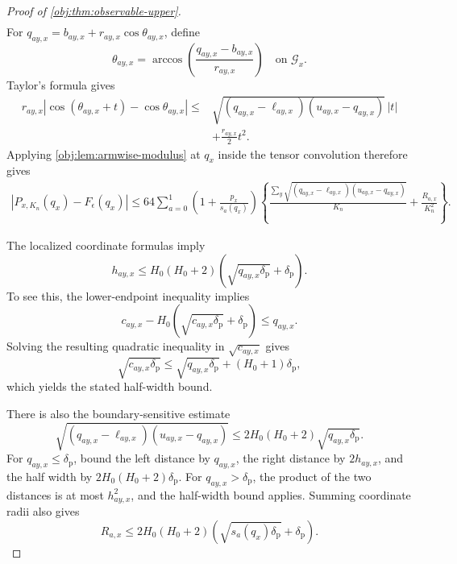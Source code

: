 \documentclass[11pt]{article}
\begin{document}
\begin{proof}[Proof of \cref{obj:thm:observable-upper}]
\[\begin{aligned}
\end{aligned}
\]
For \(q_{ay,x}=b_{ay,x}+r_{ay,x}\cos\theta_{ay,x}\), define
\[
\theta_{ay,x}
=
\arccos\left(\frac{q_{ay,x}-b_{ay,x}}{r_{ay,x}}\right)
\quad\text{on }\mathcal G_x.
\]
Taylor's formula gives
\[
\begin{aligned}
r_{ay,x}
|\cos(\theta_{ay,x}+t)-\cos\theta_{ay,x}|
\le{}&
\sqrt{(q_{ay,x}-\ell_{ay,x})(u_{ay,x}-q_{ay,x})}\,|t|\\
&+\frac{r_{ay,x}}2t^2.
\end{aligned}
\]
Applying \cref{obj:lem:armwise-modulus} at \(q_x\) inside the tensor convolution therefore gives
\[
\begin{aligned}
|P_{x,K_n}(q_x)-F_\epsilon(q_x)|
\le64\sum_{a=0}^1
\left(1+\frac{p_x}{s_a(q_x)}\right)
\left\{
\frac{\sum_y\sqrt{(q_{ay,x}-\ell_{ay,x})(u_{ay,x}-q_{ay,x})}}{K_n}
+\frac{R_{a,x}}{K_n^2}
\right\}.
\end{aligned}
\]

The localized coordinate formulas imply
\[
h_{ay,x}
\le H_0(H_0+2)
\left(\sqrt{q_{ay,x}\delta_{\mathrm p}}+\delta_{\mathrm p}\right).
\]
To see this, the lower-endpoint inequality implies
\[
c_{ay,x}-H_0\left(\sqrt{c_{ay,x}\delta_{\mathrm p}}+\delta_{\mathrm p}\right)
\le q_{ay,x}.
\]
Solving the resulting quadratic inequality in \(\sqrt{c_{ay,x}}\) gives
\[
\sqrt{c_{ay,x}\delta_{\mathrm p}}
\le
\sqrt{q_{ay,x}\delta_{\mathrm p}}+(H_0+1)\delta_{\mathrm p},
\]
which yields the stated half-width bound.

There is also the boundary-sensitive estimate
\[
\sqrt{(q_{ay,x}-\ell_{ay,x})(u_{ay,x}-q_{ay,x})}
\le2H_0(H_0+2)\sqrt{q_{ay,x}\delta_{\mathrm p}}.
\]
For \(q_{ay,x}\le\delta_{\mathrm p}\), bound the left distance by \(q_{ay,x}\), the right distance by \(2h_{ay,x}\), and the half width by
\(2H_0(H_0+2)\delta_{\mathrm p}\). For \(q_{ay,x}>\delta_{\mathrm p}\), the product of the two distances is at most \(h_{ay,x}^2\), and the half-width bound applies. Summing coordinate radii also gives
\[
R_{a,x}
\le2H_0(H_0+2)
\left(\sqrt{s_a(q_x)\delta_{\mathrm p}}+\delta_{\mathrm p}\right).
\]


\end{proof}
\end{document}
